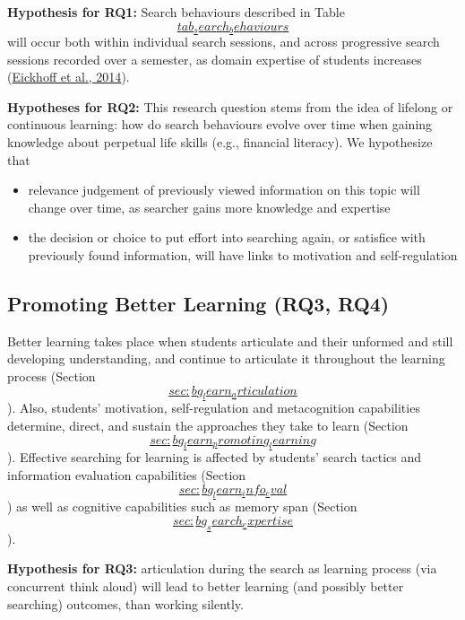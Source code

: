 \documentclass[a4paper, nobind]{templates/ociamthesis}
\begin{document}
\textbf{Hypothesis for RQ1:} Search behaviours described in Table
\protect\hyperlink{tab_search_behaviours}{\[tab_search_behaviours\]} will occur both within individual
search sessions, and across progressive search sessions recorded over a
semester, as domain expertise of students increases
(\protect\hyperlink{ref-eickhoff2014lessons}{Eickhoff et al., 2014}).

\textbf{Hypotheses for RQ2:} This research question stems from the idea of
lifelong or continuous learning: how do search behaviours evolve over
time when gaining knowledge about perpetual life skills (e.g., financial
literacy). We hypothesize that

\begin{itemize}
\item
  relevance judgement of previously viewed information on this topic
  will change over time, as searcher gains more knowledge and
  expertise
\item
  the decision or choice to put effort into searching again, or
  satisfice with previously found information, will have links to
  motivation and self-regulation
\end{itemize}

\hypertarget{sec:framework_rq3_rq4}{%
\subsection{Promoting Better Learning (RQ3, RQ4)}\label{sec:framework_rq3_rq4}}

Better learning takes place when students articulate and their unformed
and still developing understanding, and continue to articulate it
throughout the learning process (Section
\protect\hyperlink{sec:bg_learn_articulation}{\[sec:bg_learn_articulation\]}). Also, students' motivation,
self-regulation and metacognition capabilities determine, direct, and
sustain the approaches they take to learn (Section
\protect\hyperlink{sec:bg_learn_promoting_learning}{\[sec:bg_learn_promoting_learning\]}). Effective searching for
learning is affected by students' search tactics and information
evaluation capabilities (Section
\protect\hyperlink{sec:bg_learn_info_eval}{\[sec:bg_learn_info_eval\]}) as well as cognitive capabilities
such as memory span (Section
\protect\hyperlink{sec:bg_search_expertise}{\[sec:bg_search_expertise\]}).

\textbf{Hypothesis for RQ3:} articulation during the search as learning
process (via concurrent think aloud) will lead to better learning (and
possibly better searching) outcomes, than working silently.
\end{document}
